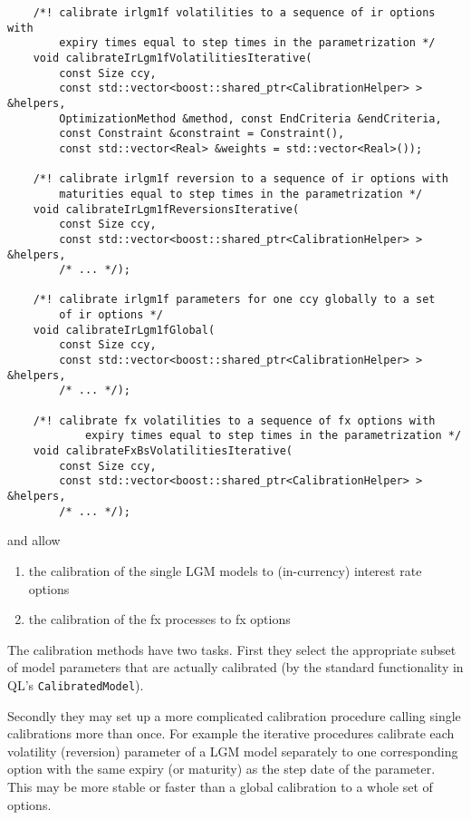 \documentclass[12pt, a4paper]{article}
\begin{document}
\medskip
\scriptsize
\begin{verbatim}
    /*! calibrate irlgm1f volatilities to a sequence of ir options with
        expiry times equal to step times in the parametrization */
    void calibrateIrLgm1fVolatilitiesIterative(
        const Size ccy,
        const std::vector<boost::shared_ptr<CalibrationHelper> > &helpers,
        OptimizationMethod &method, const EndCriteria &endCriteria,
        const Constraint &constraint = Constraint(),
        const std::vector<Real> &weights = std::vector<Real>());

    /*! calibrate irlgm1f reversion to a sequence of ir options with
        maturities equal to step times in the parametrization */
    void calibrateIrLgm1fReversionsIterative(
        const Size ccy,
        const std::vector<boost::shared_ptr<CalibrationHelper> > &helpers,
        /* ... */);

    /*! calibrate irlgm1f parameters for one ccy globally to a set
        of ir options */
    void calibrateIrLgm1fGlobal(
        const Size ccy,
        const std::vector<boost::shared_ptr<CalibrationHelper> > &helpers,
        /* ... */);

    /*! calibrate fx volatilities to a sequence of fx options with
            expiry times equal to step times in the parametrization */
    void calibrateFxBsVolatilitiesIterative(
        const Size ccy,
        const std::vector<boost::shared_ptr<CalibrationHelper> > &helpers,
        /* ... */);
\end{verbatim}
\normalsize
\medskip

and allow 

\begin{enumerate}
\item the calibration of the single LGM models to (in-currency) interest rate options
\item the calibration of the fx processes to fx options
\end{enumerate}

The calibration methods have two tasks. First they select the appropriate subset of model parameters that are actually calibrated (by the standard functionality in QL's \verb+CalibratedModel+). 

Secondly they may set up a more complicated calibration procedure calling single calibrations more than once. For example the iterative procedures calibrate each volatility (reversion) parameter of a LGM model separately to one corresponding option with the same expiry (or maturity) as the step date of the parameter. This may be more stable or faster than a global calibration to a whole set of options.
\end{document}
